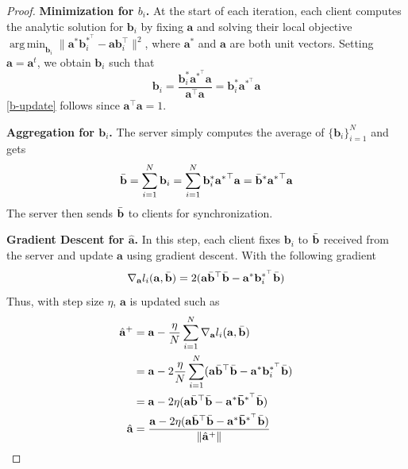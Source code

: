 \documentclass{article}
\DeclareMathOperator*{\argmin}{arg\,min}
\theoremstyle{plain}
\theoremstyle{definition}
\theoremstyle{remark}
\begin{document}
\begin{proof}
\textbf{Minimization for $b_i$. } At the start of each iteration, each client computes the analytic solution for $\mathbf{b}_i$ by fixing $\mathbf{a}$ and solving their local objective $\argmin_{\mathbf{b}_i} \lVert \mathbf{a}^*\mathbf{b}_i^{*^\top}- \mathbf{a}\mathbf{b}_i^\top \rVert^2$, where $\mathbf{a}^*$ and $\mathbf{a}$ are both unit vectors. Setting $\mathbf{a} = \mathbf{a}^t$, we obtain $\mathbf{b}_i$ such that
\begin{equation}
    \mathbf{b}_i = \frac{\mathbf{b}_i^{*}\mathbf{a}^{*^\top} \mathbf{a} }{\mathbf{a}^\top \mathbf{a}} =\mathbf{b}_i^{*}  \mathbf{a}^{*^\top} \mathbf{a} \label{b-update}
\end{equation}
\eqref{b-update} follows since $\mathbf{a}^\top \mathbf{a}=1$.

\textbf{Aggregation for $\mathbf{b}_i$. } The server simply computes the average of $\{\mathbf{b}_i\}_{i=1}^N$ and gets 
\begin{equation}
\Bar{\mathbf{b}} = \sum_{i=1}^N \mathbf{b}_i = \sum_{i=1}^N \mathbf{b}_i^* \mathbf{a^*}^\top \mathbf{a} = \Bar{\mathbf{b}}^*\mathbf{a^*}^\top \mathbf{a}
\end{equation}
The server then sends $\Bar{\mathbf{b}}$ to clients for synchronization.

\textbf{Gradient Descent for $\hat{\mathbf{a}}$.}
In this step, each client fixes $\mathbf{b}_i$ to $\Bar{\mathbf{b}}$ received from the server and update $\mathbf{a}$ using gradient descent. With the following gradient
\begin{equation}
    \nabla_{\mathbf{a}}l_i(\mathbf{a}, \Bar{\mathbf{b}}) = 2(\mathbf{a}\Bar{\mathbf{b}}^\top\Bar{\mathbf{b}}-\mathbf{a}^*\mathbf{b}_i^{*^\top}\Bar{\mathbf{b}})
\end{equation}
Thus, with step size $\eta$, $\mathbf{a}$ is updated such as
\begin{align}
\hat{\mathbf{a}}^{+} &= \mathbf{a}-\frac{\eta}{N}\sum_{i=1}^{N} \nabla_{\mathbf{a}}l_i(\mathbf{a},\Bar{\mathbf{b}}) \nonumber\\
&= \mathbf{a}-2\frac{\eta}{N} \sum_{i=1}^{N} (\mathbf{a}\Bar{\mathbf{b}}^\top\Bar{\mathbf{b}}-\mathbf{a}^*\mathbf{b}_i^{*^\top}\Bar{\mathbf{b}}) \nonumber\\
& = \mathbf{a}- 2\eta (\mathbf{a}\Bar{\mathbf{b}}^\top\Bar{\mathbf{b}}-\mathbf{a}^*\mathbf{\Bar{b}}^{*^\top}\Bar{\mathbf{b}}) \\
\hat{\mathbf{a}} &= \frac{\mathbf{a}- 2\eta (\mathbf{a}\Bar{\mathbf{b}}^\top\Bar{\mathbf{b}}-\mathbf{a}^*\mathbf{\Bar{b}}^{*^\top}\Bar{\mathbf{b}})}{\lVert \hat{\mathbf{a}}^{+} \rVert}
\end{align}
\end{proof}
\end{document}
